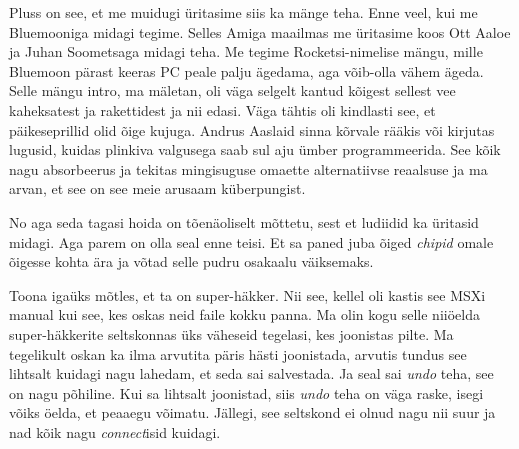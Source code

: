 Pluss on see, et me muidugi üritasime  siis ka mänge teha. Enne veel, kui me Bluemooniga  midagi tegime. Selles Amiga maailmas me üritasime koos Ott Aaloe ja Juhan Soometsaga midagi teha. Me tegime Rocketsi-nimelise mängu, mille Bluemoon pärast keeras PC peale palju ägedama, aga võib-olla vähem ägeda. Selle mängu intro, ma mäletan, oli väga selgelt kantud kõigest sellest vee kaheksatest ja rakettidest ja nii edasi. Väga tähtis oli kindlasti see, et päikeseprillid olid õige kujuga. Andrus Aaslaid sinna kõrvale rääkis või kirjutas lugusid, kuidas plinkiva valgusega saab sul aju ümber programmeerida. See kõik nagu absorbeerus ja tekitas mingisuguse omaette alternatiivse reaalsuse ja ma arvan, et see on see meie arusaam küberpungist. 


No aga seda tagasi hoida on tõenäoliselt mõttetu, sest et ludiidid ka üritasid midagi. Aga parem on olla seal enne teisi. Et sa paned juba õiged \emph{chipid} omale õigesse kohta  ära ja võtad selle pudru osakaalu väiksemaks. 


Toona igaüks mõtles, et ta on super-häkker. Nii see, kellel oli kastis see MSXi manual kui see, kes oskas neid faile kokku panna. Ma olin kogu selle niiöelda super-häkkerite seltskonnas üks väheseid tegelasi, kes joonistas pilte. Ma  tegelikult oskan ka ilma arvutita päris hästi joonistada, arvutis tundus see lihtsalt  kuidagi nagu lahedam, et seda sai salvestada. Ja  seal sai \emph{undo} teha, see on nagu põhiline. Kui sa lihtsalt joonistad, siis \emph{undo} teha on väga raske, isegi võiks öelda, et peaaegu võimatu. Jällegi, see seltskond ei olnud nagu nii suur ja nad kõik nagu \emph{connect}isid kuidagi. 

